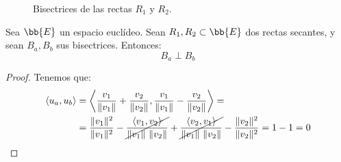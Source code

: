 \begin{definicion}
\begin{figure}[H]
        \caption{Bisectrices de las rectas $R_1$ y $R_2$.}
    \end{figure}
\end{definicion}

\begin{lema}
    Sea $\bb{E}$ un espacio euclídeo. Sean $R_1,R_2\subset \bb{E}$ dos rectas secantes, y sean $B_a,B_b$ sus bisectrices. Entonces:
    \begin{equation*}
        B_a \perp B_b
    \end{equation*}
\end{lema}
\begin{proof}
    Tenemos que:
    \begin{align*}
        \langle u_a,u_b\rangle
        &= \left\langle \frac{v_1}{\|v_1\|} + \frac{v_2}{\|v_2\|}, \frac{v_1}{\|v_1\|} - \frac{v_2}{\|v_2\|}\right\rangle = \\
        &= \frac{\|v_1\|^2}{\|v_1\|^2} - \cancel{\frac{\langle v_1, v_2\rangle}{\|v_1\|~\|v_2\|}} + \cancel{\frac{\langle v_2, v_1\rangle}{\|v_1\|~\|v_2\|}} - \frac{\|v_2\|^2}{\|v_2\|^2}
        =1-1= 0
    \end{align*}
\end{proof}

